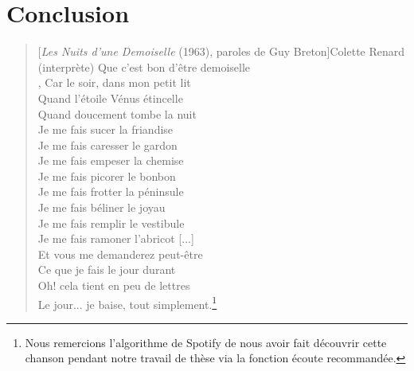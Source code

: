 \chapter*{Conclusion}

\begin{quote}[\textit{Les Nuits d'une Demoiselle} (1963), paroles de Guy Breton]{Colette Renard (interprète)}
Que c'est bon d'être demoiselle \\,
Car le soir, dans mon petit lit \\
Quand l'étoile Vénus étincelle \\
Quand doucement tombe la nuit \\  
Je me fais sucer la friandise \\
Je me fais caresser le gardon \\
Je me fais empeser la chemise \\
Je me fais picorer le bonbon \\
Je me fais frotter la péninsule \\
Je me fais béliner le joyau \\
Je me fais remplir le vestibule \\
Je me fais ramoner l'abricot {[...]} \\
Et vous me demanderez peut-être \\
Ce que je fais le jour durant \\
Oh! cela tient en peu de lettres \\
Le jour... je baise, tout simplement.\footnote{Nous remercions l'algorithme de Spotify de nous avoir fait découvrir cette chanson pendant notre travail de thèse via la fonction écoute recommandée.}
\end{quote}

